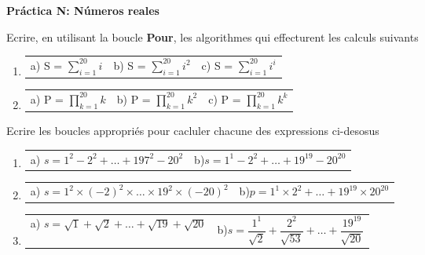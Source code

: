 \documentclass[10pt,a4paper,notitlepage]{article}
\begin{document}
%
%
\begin{center}
    \large{\textbf{Práctica N: Números reales}}
\end{center}

%
%
\begin{ejercicio}[]
    \hspace{2ex}Ecrire, en utilisant la boucle \textbf{Pour}, les algorithmes qui effecturent les calculs suivants
    \begin{enumerate}
        \item
              \begin{tabular}{p{3cm}p{3cm}p{3cm}}
                  a) S = $\sum_{i=1}^{20} i$ & b) S = $\sum_{i=1}^{20} i^2$ & c) S = $ \sum_{i=1}^{20} i^i$
              \end{tabular}
        \item
              \begin{tabular}{p{3cm}p{3cm}p{3cm}}
                  a) P = $\prod_{k=1}^{20} k$ & b) P = $ \prod_{k=1}^{20} k^2$ & c) P = $ \prod_{k=1}^{20} k^k $ \\
              \end{tabular}
    \end{enumerate}
\end{ejercicio}

\begin{ejercicio}
    \hspace{2ex} Ecrire les boucles appropri\'es pour cacluler chacune des expressions ci-desosus\\
    \begin{enumerate}
        \item
              \begin{tabular}{p{7cm}p{7cm}}
                  a) $s= 1^2-2^2+\dots +197^2-20^2$ & b)$ s = 1^1 - 2^2 + \dots +19^{19} -20^{20}$ \\
              \end{tabular}
        \item
              \begin{tabular}{p{7cm}p{7cm}}
                  a) $s= 1^2\times (-2)^2 \times \dots \times 19^2 \times (-20)^{2}$ & b)$ p = 1^1 \times 2^2 + \dots +19^{19} \times 20^{20}$ \\
              \end{tabular}
        \item
              \begin{tabular}{p{7cm}p{7cm}}
                  a) $s= \sqrt{1}+\sqrt{2}+\dots +\sqrt{19}+\sqrt{20}$ & b)$ s = \dfrac{1^1}{\sqrt{2}} + \dfrac{2^2}{\sqrt{53}} + \dots +\dfrac{19^{19}}{\sqrt{20}}$ \\
              \end{tabular}
    \end{enumerate}
\end{ejercicio}
\end{document}

